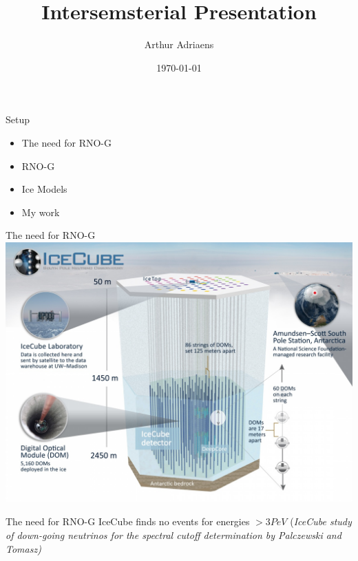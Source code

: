 \documentclass{beamer}
\title{Intersemsterial Presentation}
\author{Arthur Adriaens}
\date{\today}
\begin{document}
\begin{frame}
	\titlepage
\end{frame}
\begin{frame}{Setup}
  \begin{itemize}
    \item The need for RNO-G
    \item RNO-G
    \item Ice Models
    \item My work
  \end{itemize}
\end{frame}
\begin{frame}{The need for RNO-G}
  \includegraphics[height=0.9\textheight]{figures/icecube.jpg}
\end{frame}
\begin{frame}{The need for RNO-G}
  IceCube finds no events for energies $> 3PeV$ (\it{IceCube study of down-going neutrinos for the spectral cutoff determination by 
Palczewski and Tomasz})
\end{frame}
\end{document}
